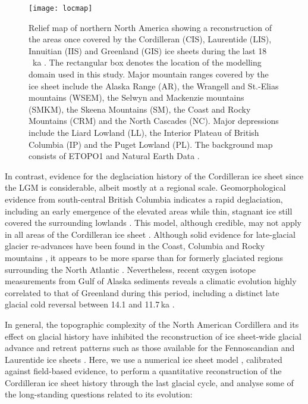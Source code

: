 \documentclass[tc]{copernicus}
\begin{document}
\begin{figure}
  \texttt{[image: locmap]}
  \caption{Relief map of northern North America showing a reconstruction of the
           areas once covered by the Cordilleran (CIS), Laurentide (LIS),
           Innuitian (IIS) and Greenland (GIS) ice sheets during the last
           18\,\unit{\,ka} \citep[21.4\,cal\,ka,][]{Dyke.2004}.
           The rectangular box denotes the location of the
           modelling domain used in this study. Major mountain ranges covered
           by the ice sheet include the Alaska Range (AR), the Wrangell and
           St.-Elias mountains (WSEM), the Selwyn and Mackenzie mountains
           (SMKM), the Skeena Mountains (SM), the Coast and Rocky
           Mountains (CRM) and the North Cascades (NC). Major depressions
           include the Liard Lowland (LL), the Interior Plateau of British
           Columbia (IP) and the Puget Lowland (PL). The background
           map consists of ETOPO1 \citep{Amante.Eakins.2009} and Natural Earth
           Data \citep{Patterson.Kelso.2014}.}
  \label{fig:locmap}
\end{figure}

In contrast, evidence for the deglaciation history of the Cordilleran
ice sheet since the LGM is considerable, albeit mostly at a regional scale.
Geomorphological evidence from south-central British Columbia indicates a rapid
deglaciation, including an early emergence of the elevated areas while thin,
stagnant ice still covered the surrounding lowlands
    \citep{Fulton.1967, Fulton.1991, Margold.etal.2011, Margold.etal.2013a}.
This model, although credible, may not apply in all areas of the Cordilleran
ice sheet
    \citep{Margold.etal.2013}.
Although solid evidence for late-glacial glacier re-advances have been found in
the Coast, Columbia and Rocky mountains
    \citep{Clague.etal.1997, Friele.Clague.2002, Friele.Clague.2002a,
           Kovanen.2002, Kovanen.Easterbrook.2002, Lakeman.etal.2008,
           Menounos.etal.2008},
it appears to be more sparse than for formerly glaciated regions surrounding
the North Atlantic
    \citep[e.g.,][]{Sissons.1979, Lundqvist.1987,
                    Ivy-Ochs.etal.1999, Stea.etal.2011}.
Nevertheless, recent oxygen isotope measurements from Gulf of Alaska sediments
reveals a climatic evolution highly correlated to that of Greenland during this
period, including a distinct late glacial cold reversal between 14.1 and
11.7\,ka \citep{Praetorius.Mix.2014}.

In general, the topographic complexity of the North American Cordillera and its
effect on glacial history have inhibited the reconstruction of ice sheet-wide
glacial advance and retreat patterns such as
those available for the Fennoscandian and Laurentide ice sheets
     \citep{Boulton.etal.2001, Dyke.Prest.1987, Dyke.etal.2003,
            Kleman.etal.1997, Kleman.etal.2010}.
Here, we use a numerical ice sheet model \citep{PISM-authors.2014},
calibrated against field-based evidence, to perform a quantitative
reconstruction of the Cordilleran ice sheet history through the last glacial
cycle, and
analyse some of the long-standing questions related to its evolution:
\end{document}
